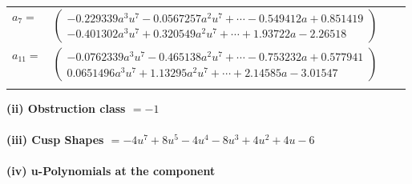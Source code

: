 \documentclass[1p]{elsarticle_modified}
\theoremstyle{definition}
\begin{document}
\begin{tabular}{m{7pt} m{180pt} m{7pt} m{180pt} }
\flushright $a_{7}=$&$\begin{pmatrix}-0.229339 a^{3} u^{7}-0.0567257 a^{2} u^{7}+\cdots-0.549412 a+0.851419\\-0.401302 a^{3} u^{7}+0.320549 a^{2} u^{7}+\cdots+1.93722 a-2.26518\end{pmatrix}$ \\
\flushright $a_{11}=$&$\begin{pmatrix}-0.0762339 a^{3} u^{7}-0.465138 a^{2} u^{7}+\cdots-0.753232 a+0.577941\\0.0651496 a^{3} u^{7}+1.13295 a^{2} u^{7}+\cdots+2.14585 a-3.01547\end{pmatrix}$\\&\end{tabular}
\flushleft \textbf{(ii) Obstruction class $= -1$}\\~\\
\flushleft \textbf{(iii) Cusp Shapes $= -4 u^7+8 u^5-4 u^4-8 u^3+4 u^2+4 u-6$}\\~\\
\newpage\renewcommand{\arraystretch}{1}
\flushleft \textbf{(iv) u-Polynomials at the component}\newline \\
\end{document}
